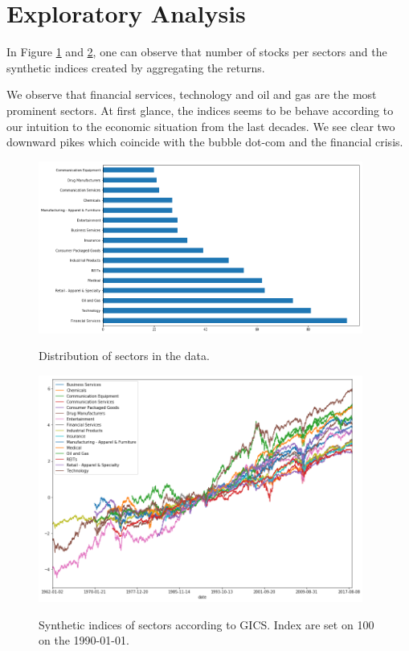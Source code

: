 \documentclass[a4paper,twoside]{article}
\begin{document}
\section{Exploratory Analysis}
\label{sec:org38a1245}

In Figure \ref{fig:distribution-sectors} and \ref{fig:gics-level}, one can
observe that number of stocks per sectors and the synthetic indices created by
aggregating the returns.

We observe that financial services, technology and oil and gas are the most
prominent sectors. At first glance, the indices seems to be behave according to
our intuition to the economic situation from the last decades. We see clear two
downward pikes which coincide with the bubble dot-com and the financial crisis.

\begin{figure}    
\begin{center}
  \label{fig:distribution-sectors}
  \includegraphics[width=0.95\textwidth]{figures/sectors_distribution}
  \caption{Distribution of sectors in the data.}
  \end{center}
\end{figure}

\begin{figure}    
\begin{center}
  \label{fig:gics-level}
  \includegraphics[width=0.95\textwidth]{figures/indexes_level}
  \caption{Synthetic indices of sectors according to GICS. Index are set on 100 on the 1990-01-01.}
  \end{center}
\end{figure}
\end{document}
